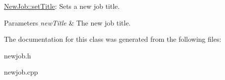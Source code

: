 \hyperlink{class_new_job_ae8c2b576f2ea6f444776e6d944f0d767}{New\+Job\+::set\+Title}\+: Sets a new job title. 


\begin{DoxyParams}{Parameters}
{\em new\+Title} & The new job title. \\
\hline
\end{DoxyParams}


The documentation for this class was generated from the following files\+:\begin{DoxyCompactItemize}
\item 
newjob.\+h\item 
newjob.\+cpp\end{DoxyCompactItemize}
